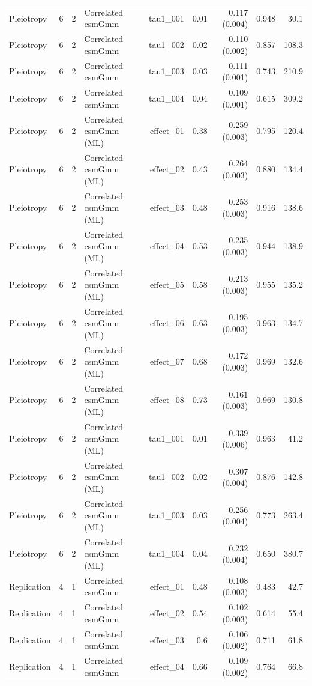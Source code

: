 \begin{longtable}{lcclrrrrr}
Pleiotropy & 6 & 2 & Correlated csmGmm & tau1\_001 & 0.01 & 0.117 (0.004) & 0.948 & 30.1\\
Pleiotropy & 6 & 2 & Correlated csmGmm & tau1\_002 & 0.02 & 0.110 (0.002) & 0.857 & 108.3\\
Pleiotropy & 6 & 2 & Correlated csmGmm & tau1\_003 & 0.03 & 0.111 (0.001) & 0.743 & 210.9\\
Pleiotropy & 6 & 2 & Correlated csmGmm & tau1\_004 & 0.04 & 0.109 (0.001) & 0.615 & 309.2\\
Pleiotropy & 6 & 2 & Correlated csmGmm (ML) & effect\_01 & 0.38 & 0.259 (0.003) & 0.795 & 120.4\\
Pleiotropy & 6 & 2 & Correlated csmGmm (ML) & effect\_02 & 0.43 & 0.264 (0.003) & 0.880 & 134.4\\
Pleiotropy & 6 & 2 & Correlated csmGmm (ML) & effect\_03 & 0.48 & 0.253 (0.003) & 0.916 & 138.6\\
Pleiotropy & 6 & 2 & Correlated csmGmm (ML) & effect\_04 & 0.53 & 0.235 (0.003) & 0.944 & 138.9\\
Pleiotropy & 6 & 2 & Correlated csmGmm (ML) & effect\_05 & 0.58 & 0.213 (0.003) & 0.955 & 135.2\\
Pleiotropy & 6 & 2 & Correlated csmGmm (ML) & effect\_06 & 0.63 & 0.195 (0.003) & 0.963 & 134.7\\
Pleiotropy & 6 & 2 & Correlated csmGmm (ML) & effect\_07 & 0.68 & 0.172 (0.003) & 0.969 & 132.6\\
Pleiotropy & 6 & 2 & Correlated csmGmm (ML) & effect\_08 & 0.73 & 0.161 (0.003) & 0.969 & 130.8\\
Pleiotropy & 6 & 2 & Correlated csmGmm (ML) & tau1\_001 & 0.01 & 0.339 (0.006) & 0.963 & 41.2\\
Pleiotropy & 6 & 2 & Correlated csmGmm (ML) & tau1\_002 & 0.02 & 0.307 (0.004) & 0.876 & 142.8\\
Pleiotropy & 6 & 2 & Correlated csmGmm (ML) & tau1\_003 & 0.03 & 0.256 (0.004) & 0.773 & 263.4\\
Pleiotropy & 6 & 2 & Correlated csmGmm (ML) & tau1\_004 & 0.04 & 0.232 (0.004) & 0.650 & 380.7\\
Replication & 4 & 1 & Correlated csmGmm & effect\_01 & 0.48 & 0.108 (0.003) & 0.483 & 42.7\\
Replication & 4 & 1 & Correlated csmGmm & effect\_02 & 0.54 & 0.102 (0.003) & 0.614 & 55.4\\
Replication & 4 & 1 & Correlated csmGmm & effect\_03 & 0.6 & 0.106 (0.002) & 0.711 & 61.8\\
Replication & 4 & 1 & Correlated csmGmm & effect\_04 & 0.66 & 0.109 (0.002) & 0.764 & 66.8\\

\end{longtable}
